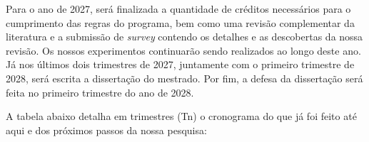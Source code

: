 \documentclass[11pt,a4paper]{article}
\newcommand{\en}[1]{\textit{#1}}
\begin{document}
Para o ano de 2027, será finalizada a quantidade de créditos necessários para o cumprimento das regras do programa, bem como uma revisão complementar da literatura e a submissão de \en{survey} contendo os detalhes e as descobertas da nossa revisão. Os nossos experimentos continuarão sendo realizados ao longo deste ano. Já nos últimos dois trimestres de 2027, juntamente com o primeiro trimestre de 2028, será escrita a dissertação do mestrado. Por fim, a defesa da dissertação será feita no primeiro trimestre do ano de 2028.

A tabela abaixo detalha em trimestres (Tn) o cronograma do que já foi feito até aqui e dos próximos passos da nossa pesquisa:

\begin{table}[H]
    \centering
    \renewcommand{\arraystretch}{1.20}
\end{table}
\end{document}
